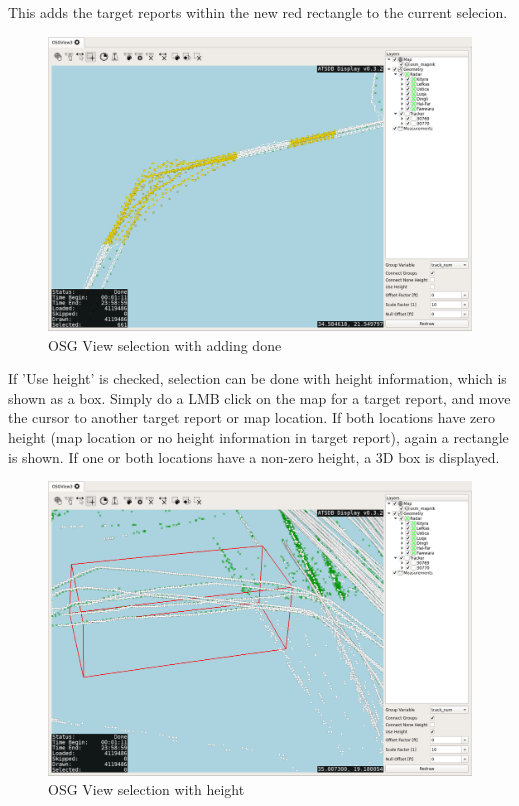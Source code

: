 This adds the target reports within the new red rectangle to the current selecion.

\begin{figure}[H]
    \hspace*{-2cm}
    \includegraphics[width=18cm,frame]{../screenshots/osgview_select_add2.png}
  \caption{OSG View selection with adding done}
\end{figure}

If 'Use height' is checked, selection can be done with height information, which is shown as a box. Simply do a LMB click on the map for a target report, and move the cursor to another target report or map location. If both locations have zero height (map location or no height information in target report), again a rectangle is shown. If one or both locations have a non-zero height, a 3D box is displayed.

\begin{figure}[H]
    \hspace*{-2cm}
    \includegraphics[width=18cm,frame]{../screenshots/osgview_select3d.png}
  \caption{OSG View selection with height}
\end{figure}


